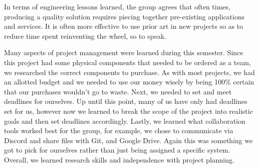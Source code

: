 In terms of engineering lessons learned, the group agrees that often times, producing a quality solution requires piecing together pre-existing applications and services. 
It is often more effective to use prior art in new projects so as to reduce time spent reinventing the wheel, so to speak.

Many aspects of project management were learned during this semester. 
Since this project had some physical components that needed to be ordered as a team, we researched the correct components to purchase. 
As with most projects, we had an allotted budget and we needed to use our money wisely by being 100\% certain that our purchases wouldn’t go to waste. 
Next, we needed to set and meet deadlines for ourselves. 
Up until this point, many of us have only had deadlines set for us, however now we learned to break the scope of the project into realistic goals and then set deadlines accordingly. 
Lastly, we learned what collaboration tools worked best for the group, for example, we chose to communicate via Discord and share files with Git, and Google Drive. 
Again this was something we got to pick for ourselves rather than just being assigned a specific system. 
Overall, we learned research skills and independence with project planning. 
